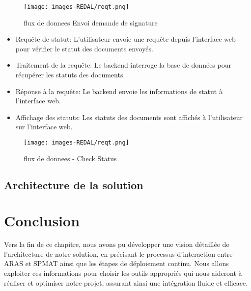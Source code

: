 \begin{figure}[H]
\begin{center}
\texttt{[image: images-REDAL/reqt.png]}
\end{center}
\caption{flux de donnees Envoi demande de signature}
\end{figure}


\begin{itemize}


\item Requête de statut:
L'utilisateur envoie une requête depuis l'interface web pour vérifier le statut des documents envoyés.
\item Traitement de la requête:
Le backend interroge la base de données pour récupérer les statuts des documents.
\item Réponse à la requête:
Le backend envoie les informations de statut à l'interface web.
\item Affichage des statuts: 
Les statuts des documents sont affichés à l'utilisateur sur l'interface web.
\end{itemize}

\begin{figure}[H]
\begin{center}
\texttt{[image: images-REDAL/reqt.png]}
\end{center}
\caption{flux de donnees - Check Status}
\end{figure}




\subsection{Architecture de la solution}
\section{Conclusion}
\quad Vers la fin de ce chapitre, nous avons pu développer une vision détaillée de l’architecture de notre solution, en précisant le processus d'interaction entre ARAS et SPMAT ainsi que les étapes de déploiement continu. Nous allons exploiter ces informations pour choisir les outils appropriés qui nous aideront à réaliser et optimiser notre projet, assurant ainsi une intégration fluide et efficace.




